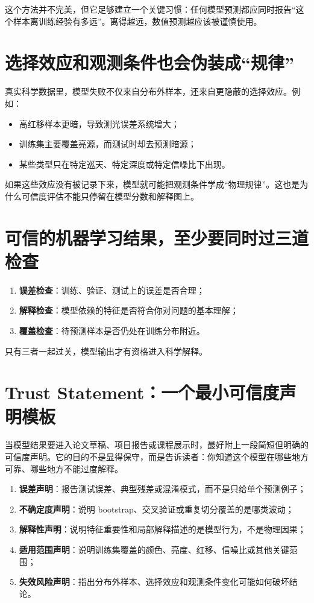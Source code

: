 这个方法并不完美，但它足够建立一个关键习惯：任何模型预测都应同时报告“这个样本离训练经验有多远”。离得越远，数值预测越应该被谨慎使用。

\section{选择效应和观测条件也会伪装成“规律”}

真实科学数据里，模型失败不仅来自分布外样本，还来自更隐蔽的选择效应。例如：

\begin{itemize}
    \item 高红移样本更暗，导致测光误差系统增大；
    \item 训练集主要覆盖亮源，而测试时却去预测暗源；
    \item 某些类型只在特定巡天、特定深度或特定信噪比下出现。
\end{itemize}

如果这些效应没有被记录下来，模型就可能把观测条件学成“物理规律”。这也是为什么可信度评估不能只停留在模型分数和解释图上。

\section{可信的机器学习结果，至少要同时过三道检查}

\begin{enumerate}
    \item \textbf{误差检查}：训练、验证、测试上的误差是否合理；
    \item \textbf{解释检查}：模型依赖的特征是否符合你对问题的基本理解；
    \item \textbf{覆盖检查}：待预测样本是否仍处在训练分布附近。
\end{enumerate}

只有三者一起过关，模型输出才有资格进入科学解释。

\section{Trust Statement：一个最小可信度声明模板}

当模型结果要进入论文草稿、项目报告或课程展示时，最好附上一段简短但明确的可信度声明。它的目的不是显得保守，而是告诉读者：你知道这个模型在哪些地方可靠、哪些地方不能过度解释。

\begin{enumerate}
    \item \textbf{误差声明}：报告测试误差、典型残差或混淆模式，而不是只给单个预测例子；
    \item \textbf{不确定度声明}：说明 bootstrap、交叉验证或重复切分覆盖的是哪类波动；
    \item \textbf{解释性声明}：说明特征重要性和局部解释描述的是模型行为，不是物理因果；
    \item \textbf{适用范围声明}：说明训练集覆盖的颜色、亮度、红移、信噪比或其他关键范围；
    \item \textbf{失效风险声明}：指出分布外样本、选择效应和观测条件变化可能如何破坏结论。
\end{enumerate}

